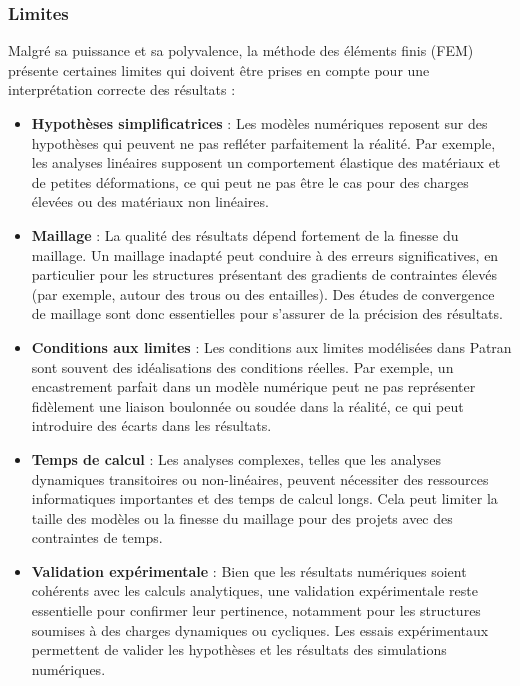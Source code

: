 \subsubsection{Limites}

Malgré sa puissance et sa polyvalence, la méthode des éléments finis (\acrshort{FEM}) 
présente certaines limites qui doivent être prises en compte pour une interprétation 
correcte des résultats :

\begin{itemize}
    \item \textbf{Hypothèses simplificatrices} :
    Les modèles numériques reposent sur des hypothèses qui peuvent ne pas refléter 
    parfaitement la réalité. Par exemple, les analyses linéaires supposent un 
    comportement élastique des matériaux et de petites déformations, ce qui peut ne pas 
    être le cas pour des charges élevées ou des matériaux non linéaires.

    \item \textbf{Maillage} :
    La qualité des résultats dépend fortement de la finesse du maillage. Un maillage 
    inadapté peut conduire à des erreurs significatives, en particulier pour les 
    structures présentant des gradients de contraintes élevés (par exemple, autour des 
    trous ou des entailles). Des études de convergence de maillage sont donc essentielles
     pour s'assurer de la précision des résultats.

    \item \textbf{Conditions aux limites} :
    Les conditions aux limites modélisées dans Patran sont souvent des idéalisations 
    des conditions réelles. Par exemple, un encastrement parfait dans un modèle 
    numérique peut ne pas représenter fidèlement une liaison boulonnée ou soudée dans 
    la réalité, ce qui peut introduire des écarts dans les résultats.

    \item \textbf{Temps de calcul} :
    Les analyses complexes, telles que les analyses dynamiques transitoires ou 
    non-linéaires, peuvent nécessiter des ressources informatiques importantes et 
    des temps de calcul longs. Cela peut limiter la taille des modèles ou la finesse 
    du maillage pour des projets avec des contraintes de temps.

    \item \textbf{Validation expérimentale} :
    Bien que les résultats numériques soient cohérents avec les calculs analytiques,
    une validation expérimentale reste essentielle pour confirmer leur pertinence, 
    notamment pour les structures soumises à des charges dynamiques ou cycliques. Les 
    essais expérimentaux permettent de valider les hypothèses et les résultats des 
    simulations numériques.
\end{itemize}

